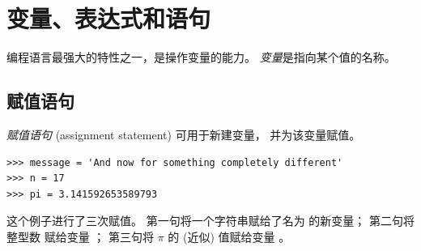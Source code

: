 


\chapter{变量、表达式和语句}


编程语言最强大的特性之一，是操作变量的能力。  
{\em 变量}是指向某个值的名称。

  

\section{赋值语句}
\label{variables}
  
  


{\em 赋值语句} (assignment statement) 可用于新建变量， 并为该变量赋值。  

\begin{lstlisting}
>>> message = 'And now for something completely different'
>>> n = 17
>>> pi = 3.141592653589793
\end{lstlisting}
%

这个例子进行了三次赋值。  
第一句将一个字符串赋给了名为  的新变量； 第二句将整型数  赋给变量 ； 第三句将 $\pi$ 的 (近似) 值赋给变量 。

  


